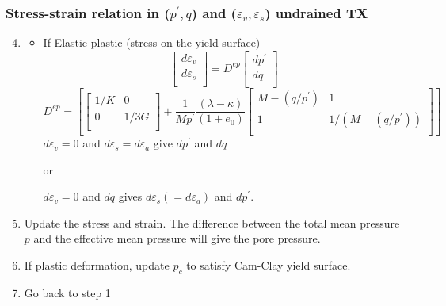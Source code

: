 \documentclass[notes]{beamer}
\begin{document}
\begin{frame}
\frametitle{Stress-strain relation in ($p^\prime, q$) and ($\varepsilon_v, \varepsilon_s$) undrained TX}		
\begin{enumerate}
\setcounter{enumi}{3}
\item 

\begin{itemize}
\item If Elastic-plastic (stress on the yield surface)
\begin{equation*}
\begin{bmatrix}
d\varepsilon_v \\
d\varepsilon_s \\
\end{bmatrix} = %
%
D^{ep}
%
\begin{bmatrix}
dp^\prime \\
dq\\
\end{bmatrix}
\end{equation*}		
\begin{equation*}
D^{ep} =\left[
\begin{bmatrix}
1/K & 0 \\
0 & 1/3G\\
\end{bmatrix} + %
%
\frac{1}{Mp^\prime}%
\frac{(\lambda - \kappa)}{(1+e_0)}%
%
\begin{bmatrix}
M - (q/p^\prime) & 1     \\
1 & 1/(M - (q/p^\prime)) \\
\end{bmatrix}
\right]
\end{equation*}
$d\varepsilon_v = 0$ and $d\varepsilon_s = d\varepsilon_a$ give $dp^\prime$ and $dq$ 

or 

$d\varepsilon_v = 0$ and $dq$ gives $d\varepsilon_s(=d\varepsilon_a)$ and $dp^\prime$.
\end{itemize}
\item Update the stress and strain. The difference between the total mean pressure $p$ and the effective mean pressure will give the pore pressure.
\item If plastic deformation, update $p_c$ to satisfy Cam-Clay yield surface.
\item Go back to step 1
\end{enumerate}
\end{frame}
\end{document}
